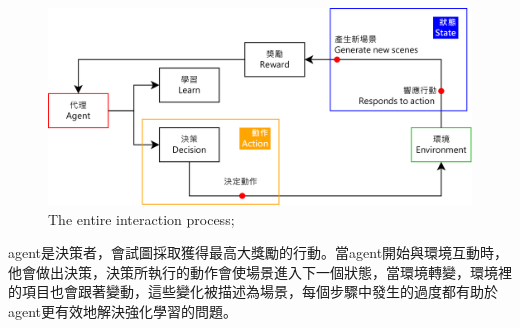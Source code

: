 \documentclass[14pt,a4paper]{report}  %
\begin{document}
\begin{figure}[hbt!]
\begin{center}
\includegraphics[width=15cm]{The_entire_interaction_process}
\caption{The entire interaction process; }%
\end{center}
\end{figure}
\qquad agent是決策者，會試圖採取獲得最高大獎勵的行動。當agent開始與環境互動時，他會做出決策，決策所執行的動作會使場景進入下一個狀態，當環境轉變，環境裡的項目也會跟著變動，這些變化被描述為場景，每個步驟中發生的過度都有助於agent更有效地解決強化學習的問題。\\[12pt]

\end{document}
